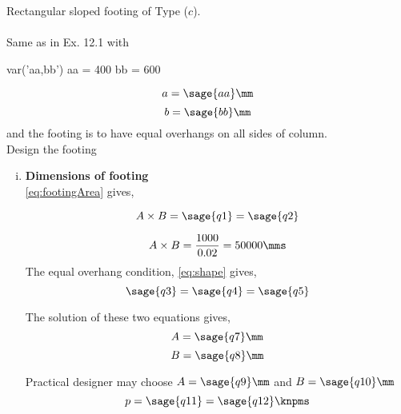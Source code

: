 \begin{example}
Rectangular sloped footing of Type ($c$).\\
\given \\
Same as in Ex. 12.1 with

\begin{sagesilent}                                                      
  var('aa,bb')                                                          
  aa = 400                                                               
  bb = 600                                                               
\end{sagesilent}                                                        
                                                                        
$$a = \sage{aa} \mm$$                                                    
$$b = \sage{bb} \mm$$ 
and the footing is to have equal overhangs on all sides of column.\\
\required Design the footing\\
\solution

\begin{enumerate}[(i)]
\begin{sagesilent}
  m1(P,p) = P/p
  q1 = m1(P,p)
  q2 = m1(PP,pp).n(digits=4)
  m2(a,b) = b - a
  q3 = m2(a,b)
  q4 = m2(A,B)
  q5 = m2(aa,bb)

  m3(A) = A*(q5+A)-q2
  assume(A>0)
  q6 = solve(m3(A),A,solution_dict=true)
  q7 = q6[0][A]
  q7 = q7.n(digits=4)
  q7 = ceil(q7)
  m4(A) = q5+A
  q8 = m4(q7)

  q9 = multipleCheck(q7,5)
  q10 = multipleCheck(q8,5)

  m5(P,A,B) = P/(A*B)
  q11 = m5(P,A,B)
  q12 = m5(PP,q9/1000,q10/1000)
  q12 = q12.n(digits=3)
\end{sagesilent}
\item   \textbf{Dimensions of footing}\\
  \eqn \ref{eq:footingArea} gives,

  $$A \times B = \sage{q1} = \sage{q2}$$  

  $$ A\times B= \frac{1000}{0.02}=50000 \mms$$
  The equal overhang condition, \eqn \ref{eq:shape} gives,
  $$\sage{q3} = \sage{q4} = \sage{q5}$$
  
  The solution of these two equations gives,
  $$A = \sage{q7} \mm$$
  $$B = \sage{q8} \mm$$

  Practical designer may choose $A = \sage{q9} \mm$ and $B = \sage{q10} \mm$
  $$p = \sage{q11} = \sage{q12} \knpms$$
  

\end{enumerate}
\end{example}
